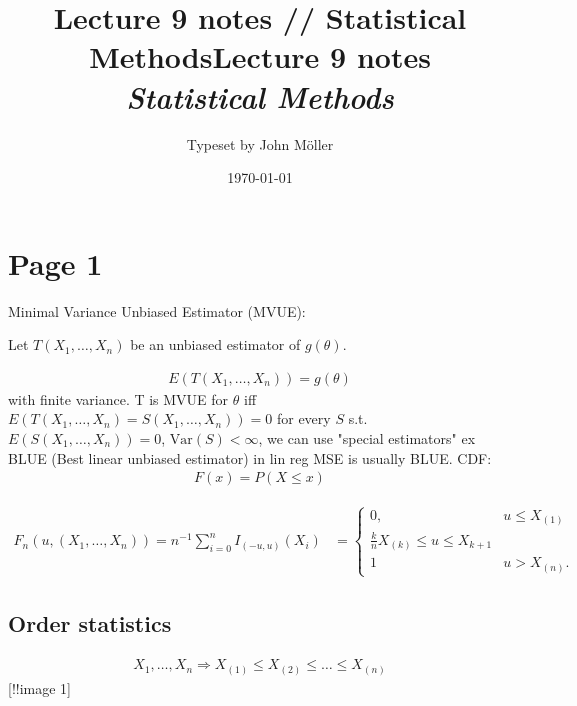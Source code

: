 \documentclass[10pt]{article}
\author{Typeset by John Möller}
\date{\today}
\title{Lecture 9 notes // Statistical Methods}
\begin{document}
\title{{Lecture 9 notes}\\{\normalsize{\itshape Statistical Methods}}}
\pagestyle{fancynotes}
\maketitle
\section{Page 1}
\label{sec:orga35b256}
Minimal Variance Unbiased Estimator (MVUE):

\begin{theorem} \label{thm:Lehman-Schally}
Let \(T(X_1, \dots , X_n)\) be an unbiased estimator of \(g(\theta )\).

\begin{align*}
E(T(X_1 , \dots , X_n)) =  g(\theta )
\end{align*}
with finite variance.
T is MVUE for \(\theta\) iff \(E(T(X_1, \dots , X_n) = S(X_1 , \dots , X_n)) =  0\) for every \(S\) s.t. \(E(S(X_1 , \dots , X_n )) =  0\),
\(\text{Var}(S) < \infty\),
we can use "special estimators" ex BLUE (Best linear unbiased estimator) in lin reg MSE is usually BLUE.
CDF:
\begin{align*}
F(x) =  P( X \leq x)
\end{align*}
\end{theorem}

\begin{definition}  \label{def:Empirical_cumulative_distribution_function}
\begin{align*}
F_n (u, (X_1, \dots , X_n)) =  n  ^{ - 1} \sum_{ i = 0 }^{ n } I  _{( - u, u)} (X_i)  &  =
\begin{cases}
0,  &  u \leq X _{(1)} \\
\frac{k}{n} X  _{(k)}  \leq u \leq  X  _{k + 1} \\
1  &  u > X  _{(n)} .
\end{cases}
\end{align*}
\end{definition}

\subsection{Order statistics}
\label{sec:orgdf3db58}
\begin{align*}
X_1 , \dots , X_n  \Rightarrow X  _{(1)} \leq X _{(2)} \leq \dots \leq X  _{(n)} 
\end{align*}
[!!image 1]
\end{document}
